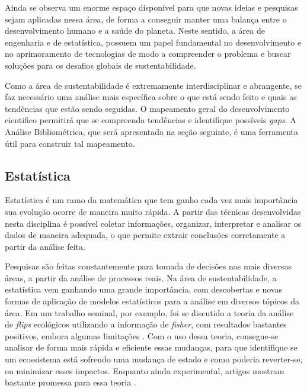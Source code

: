 \documentclass{article}[12pt]
\begin{document}
Ainda se observa um enorme espaço disponível para que novas ideias e pesquisas sejam aplicadas nessa
área, de forma a conseguir manter uma balança entre o desenvolvimento humano e a saúde do planeta.  
Neste sentido, a área de engenharia e de estatística, possuem um papel fundamental no
desenvolvimento e no aprimoramento de tecnologias de modo a compreender o problema e buscar soluções
para os desafios globais de sustentabilidade.
\par


Como a área de sustentabilidade é extremamente interdisciplinar e abrangente, se faz necessário uma
análise mais específica sobre o que está sendo feito e quais as tendências que estão sendo seguidas.
O mapeamento geral do desenvolvimento cientifico permitirá que se compreenda tendências e
identifique possíveis \textit{gaps}. A Análise Bibliométrica, que será apresentada na seção
seguinte, é uma ferramenta útil para construir tal mapeamento.\par

\subsection{Estatística}

Estatística é um ramo da matemática que tem ganho cada vez mais importância sua evolução ocorre de
maneira muito rápida. A partir das técnicas desenvolvidas nesta disciplina é possível coletar
informações, organizar, interpretar e  analisar os dados de maneira adequada, o que permite extrair
conclusões corretamente a partir da análise feita. 

Pesquisas são feitas constantemente para tomada de decisões nas mais diversas áreas, a partir da
análise de processos reais. 
Na área de sustentabilidade, a estatística vem ganhando uma grande importância, com descobertas e
novas formas de aplicação de modelos estatísticos para a análise em diversos tópicos da área. Em um
trabalho seminal, por exemplo, foi se discutido a teoria da análise de \textit{flips} ecológicos
utilizando a informação de \textit{fisher}, com resultados bastantes positivos, embora algumas
limitações \cite{Mayer2006}. %
Com o uso dessa teoria, consegue-se analisar de forma mais rápida e eficiente essas mudanças, para
que identifique se um ecossistema está sofrendo uma mudança de estado e como poderia reverter-se, ou
minimizar esses impactos. Enquanto ainda experimental, artigos mostram bastante promessa para essa
teoria %
\cite{Karunanithi2008, Rawlings2020, Konig2019}. \par
\end{document}
